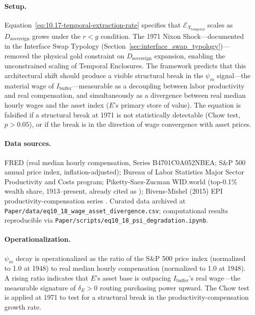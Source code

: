 \paragraph{Setup.}
Equation~\eqref{eq:10.17-temporal-extraction-rate} specifies that $\mathcal{E}_{X_{\text{temporal}}}$ scales as $D_{\text{sovereign}}$ grows under the $r < g$ condition. The 1971 Nixon Shock---documented in the Interface Swap Typology (Section~\ref{sec:interface_swap_typology})---removed the physical gold constraint on $D_{\text{sovereign}}$ expansion, enabling the unconstrained scaling of Temporal Enclosures. The framework predicts that this architectural shift should produce a visible structural break in the $\psi_m$ signal---the material wage of $I_{\text{buffer}}$---measurable as a decoupling between labor productivity and real compensation, and simultaneously as a divergence between real median hourly wages and the asset index ($E$'s primary store of value). The equation is falsified if a structural break at 1971 is not statistically detectable (Chow test, $p > 0.05$), or if the break is in the direction of wage convergence with asset prices.

\paragraph{Data sources.}
FRED (real median hourly compensation, Series B4701C0A052NBEA; S\&P 500 annual price index, inflation-adjusted); Bureau of Labor Statistics Major Sector Productivity and Costs program; Piketty-Saez-Zucman WID.world (top-0.1\% wealth share, 1913--present, already cited as \cite{piketty_saez_zucman_2018}); Bivens-Mishel (2015) EPI productivity-compensation series \cite{bivens_mishel_2015}. Curated data archived at \texttt{Paper/data/eq10\_18\_wage\_asset\_divergence.csv}; computational results reproducible via \texttt{Paper/scripts/eq10\_18\_psi\_degradation.ipynb}.

\paragraph{Operationalization.}
$\psi_m$ decay is operationalized as the ratio of the S\&P 500 price index (normalized to 1.0 at 1948) to real median hourly compensation (normalized to 1.0 at 1948). A rising ratio indicates that $E$'s asset base is outpacing $I_{\text{buffer}}$'s real wage---the measurable signature of $\delta_E > 0$ routing purchasing power upward. The Chow test is applied at 1971 to test for a structural break in the productivity-compensation growth rate.

